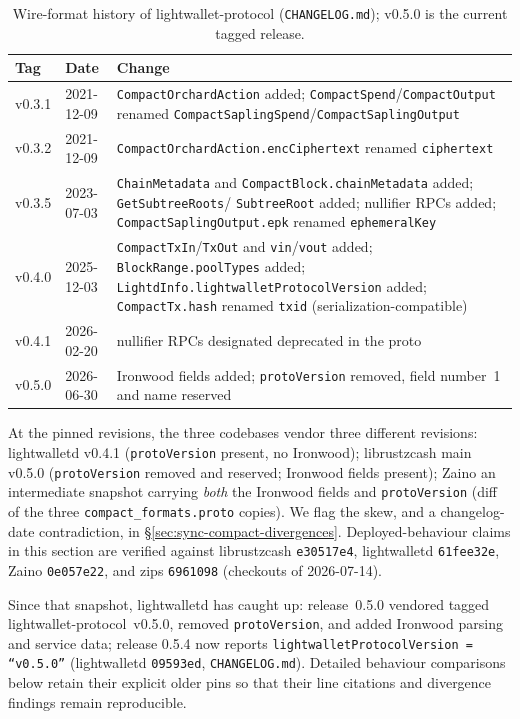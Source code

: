 \documentclass[11pt,a4paper]{article}
\theoremstyle{definition}
\begin{document}
\begin{table}[htbp]
\centering\small
\begin{tabular}{@{}llp{8.2cm}@{}}
\toprule
Tag & Date & Change \\
\midrule
v0.3.1 & 2021-12-09 & \texttt{CompactOrchardAction} added;
  \texttt{CompactSpend}/\texttt{CompactOutput} renamed
  \texttt{CompactSaplingSpend}/\texttt{CompactSaplingOutput} \\
v0.3.2 & 2021-12-09 & \texttt{CompactOrchardAction.encCiphertext} renamed
  \texttt{ciphertext} \\
v0.3.5 & 2023-07-03 & \texttt{ChainMetadata} and
  \texttt{CompactBlock.chainMetadata} added; \texttt{GetSubtreeRoots}/%
  \texttt{SubtreeRoot} added; nullifier RPCs added;
  \texttt{CompactSaplingOutput.epk} renamed \texttt{ephemeralKey} \\
v0.4.0 & 2025-12-03 & \texttt{CompactTxIn}/\texttt{TxOut} and
  \texttt{vin}/\texttt{vout} added; \texttt{BlockRange.poolTypes} added;
  \texttt{LightdInfo.lightwalletProtocolVersion} added;
  \texttt{CompactTx.hash} renamed \texttt{txid}
  (serialization-compatible) \\
v0.4.1 & 2026-02-20 & nullifier RPCs designated deprecated in the
  proto \\
v0.5.0 & 2026-06-30 & Ironwood fields added;
  \texttt{protoVersion} removed, field number~1 and name reserved \\
\bottomrule
\end{tabular}
\caption{Wire-format history of \textsf{lightwallet-protocol}
(\texttt{CHANGELOG.md}); v0.5.0 is the current tagged release.}%
\label{tab:sync-lwp-history}
\end{table}

At the pinned revisions, the three codebases vendor three different revisions:
\textsf{lightwalletd} v0.4.1 (\texttt{protoVersion} present, no Ironwood);
\textsf{librustzcash} main v0.5.0 (\texttt{protoVersion} removed and
reserved; Ironwood fields present); \textsf{Zaino} an intermediate snapshot
carrying \emph{both} the Ironwood fields and \texttt{protoVersion} (diff of
the three \texttt{compact\_formats.proto} copies). We flag the skew, and a
changelog-date contradiction, in \S\ref{sec:sync-compact-divergences}.
Deployed-behaviour claims in this section are verified against
\textsf{librustzcash} \texttt{e30517e4}, \textsf{lightwalletd}
\texttt{61fee32e}, \textsf{Zaino} \texttt{0e057e22}, and \textsf{zips}
\texttt{6961098} (checkouts of 2026-07-14).

Since that snapshot, \textsf{lightwalletd} has caught up: release~0.5.0
vendored tagged \textsf{lightwallet-protocol}~v0.5.0, removed
\texttt{protoVersion}, and added Ironwood parsing and service data; release
0.5.4 now reports \texttt{lightwalletProtocolVersion = ``v0.5.0''}
(\textsf{lightwalletd} \texttt{09593ed}, \texttt{CHANGELOG.md}). Detailed
behaviour comparisons below retain their explicit older pins so that their
line citations and divergence findings remain reproducible.
\end{document}
